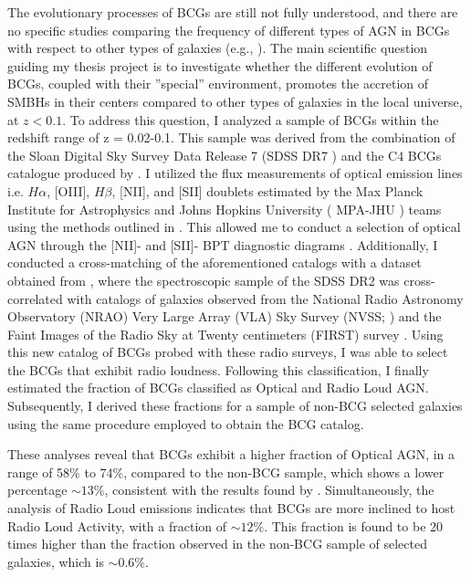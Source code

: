 The evolutionary processes of BCGs are still not fully understood, and there are no specific
studies comparing the frequency of different types of AGN in BCGs with respect to other types of
galaxies (e.g., \cite{2019CoBAO..66..153F}). The main scientific question guiding my thesis project is to
investigate whether the different evolution of BCGs, coupled with their ”special” environment,
promotes the accretion of SMBHs in their centers compared to other types of galaxies in the local
universe, at $z < 0.1$. To address this question, I analyzed a sample of BCGs within the redshift
range of z = 0.02-0.1. This sample was derived from the combination of the Sloan Digital Sky
Survey Data Release 7 (SDSS DR7 \cite{2009ApJS..182..543A}) and the
C4 BCGs catalogue produced by \cite{2007MNRAS.379..867V, 2009yCat..73790867V}. I utilized the flux measurements of optical
emission lines i.e. $H\alpha$, [OIII], $H\beta$, [NII], and [SII] doublets estimated by the Max Planck Institute for Astrophysics and Johns Hopkins University ( MPA-JHU ) teams using the methods outlined in \cite{1994ApJ...422..158O}.
This allowed me to conduct a selection of
optical AGN through the [NII]- and [SII]- BPT diagnostic diagrams  \cite{1981PASP...93....5B}.
Additionally, I conducted a cross-matching of the aforementioned catalogs with a dataset
obtained from \cite{2005MNRAS.362....9B}, where the spectroscopic sample of the SDSS DR2 was cross-correlated with catalogs of galaxies observed from the National Radio Astronomy Observatory
(NRAO) Very Large Array (VLA) Sky Survey (NVSS; \cite{1998AJ....115.1693C}) and the Faint Images of
the Radio Sky at Twenty centimeters (FIRST) survey \cite{1995ApJ...450..559B}.
Using this new catalog of BCGs probed with these radio surveys, I was able to select the BCGs
that exhibit radio loudness.
Following this classification, I finally estimated the fraction of BCGs
classified as Optical and Radio Loud AGN. Subsequently, I derived these fractions for a sample of
non-BCG selected galaxies using the same procedure employed to obtain the BCG catalog.

These analyses reveal that BCGs exhibit a higher fraction of Optical AGN, in a range of 58$\%$ to 74$\%$, compared to the
non-BCG sample, which shows a lower percentage $\sim13\%$, consistent with the results found by \cite{2012A&A...546A..17V}.
Simultaneously, the analysis of Radio Loud emissions indicates that BCGs are more
inclined to host Radio Loud Activity, with a fraction of  $\sim12\%$.
This fraction is found to be 20 times higher than the fraction observed in 
the non-BCG sample of selected galaxies, which is  $\sim0.6\%$.

